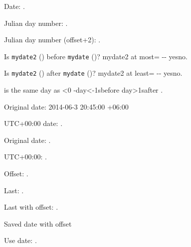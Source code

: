 \documentclass{article}
\begin{document}

Date: .

\newcount\myct
{}

Julian day number: \number\myct.


Julian day number (offset+2): \number\myct.

Is \texttt{mydate2} () before 
\texttt{mydate} ()?
\DTMifdate
 {mydate2}
 {at most=
   --}
 {yes}{no}.

Is \texttt{mydate2} () after 
\texttt{mydate} ()?
\DTMifdate
 {mydate2}
 {at least=
   --}
 {yes}{no}.


 is 
\ifnum{}
 the same day as
\else
  \ifnum\myct<0
   \number-\myct\space day\ifnum\myct<-1s\fi\space before
  \else
   \number\myct\space day\ifnum\myct>1s\fi\space after
  \fi
\fi
{}.

Original date: 2014-06-3 20:45:00 +06:00

UTC+00:00 date: .

Original date: .

UTC+00:00: .

Offset: .

Last: .

Last with offset: .

Saved date with offset

Use date: .
\end{document}
